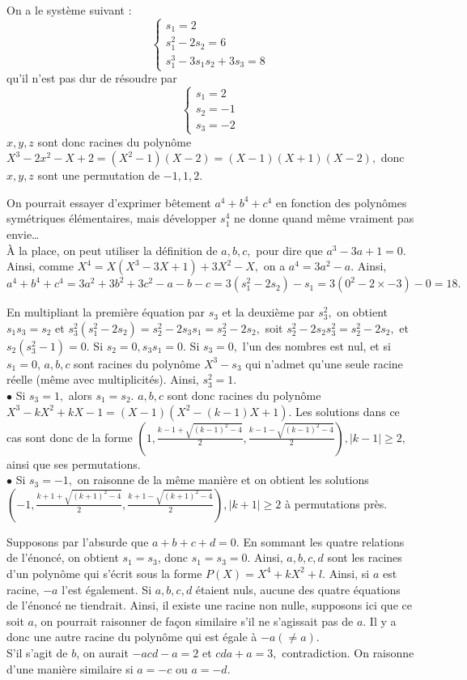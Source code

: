 \begin{sol}On a le système suivant :
\[\begin{cases}
s_1=2\\
s_1^2-2s_2=6\\
s_1^3-3s_1s_2+3s_3=8
\end{cases}\]qu'il n'est pas dur de résoudre par
$$\begin{cases}
s_1=2\\
s_2=-1\\
s_3=-2
\end{cases}$$
$x,y,z$ sont donc racines du polynôme $X^3-2x^2-X+2=(X^2-1)(X-2)=(X-1)(X+1)(X-2),$ donc $x,y,z$ sont une permutation de $-1,1,2$.
\end{sol}
\begin{sol}
On pourrait essayer d'exprimer bêtement $a^4+b^4+c^4$ en fonction des polynômes symétriques élémentaires, mais développer $s_1^4$ ne donne quand même vraiment pas envie…\\À la place, on peut utiliser la définition de $a,b,c,$ pour dire que $a^3-3a+1=0.$ Ainsi, comme $X^4=X(X^3-3X+1)+3X^2-X,$ on a $a^4=3a^2-a.$ Ainsi, $a^4+b^4+c^4=3a^2+3b^2+3c^2-a-b-c=3(s_1^2-2s_2)-s_1=3(0^2-2\times -3)-0=18.$
\end{sol}
\begin{sol}
En multipliant la première équation par $s_3$ et la deuxième par $s_3^2,$ on obtient $s_1s_3=s_2$ et $s_3^2(s_1^2-2s_2)=s_2^2-2s_3s_1=s_2^2-2s_2,$ soit $s_2^2-2s_2s_3^2=s_2^2-2s_2,$ et $s_2(s_3^2-1)=0.$ Si $s_2=0,s_3s_1=0.$ Si $s_3=0,$ l'un des nombres est nul, et si $s_1=0$, $a,b,c$ sont racines du polynôme $X^3-s_3$ qui n'admet qu'une seule racine réelle (même avec multiplicités). Ainsi, $s_3^2=1.$\\$\bullet$ Si $s_3=1,$ alors $s_1=s_2.$ $a,b,c$ sont donc racines du polynôme $X^3-kX^2+kX-1=(X-1)(X^2-(k-1)X+1).$ Les solutions dans ce cas sont donc de la forme $(1,\frac{k-1+\sqrt{(k-1)^2-4}}2,\frac{k-1-\sqrt{(k-1)^2-4}}2),|k-1|\geqslant 2,$ ainsi que ses permutations.\\
$\bullet$ Si $s_3=-1,$ on raisonne de la même manière et on obtient les solutions $(-1,\frac{k+1+\sqrt{(k+1)^2-4}}2,\frac{k+1-\sqrt{(k+1)^2-4}}2) ,|k+1|\geqslant 2$ à permutations près.
\end{sol}
\begin{sol}
Supposons par l'absurde que $a+b+c+d=0.$ En sommant les quatre relations de l'énoncé, on obtient $s_1=s_3$, donc $s_1=s_3=0.$ Ainsi, $a,b,c,d$ sont les racines d'un polynôme qui s'écrit sous la forme $P(X)=X^4+kX^2+l$. Ainsi, si $a$ est racine, $-a$ l'est également. Si $a,b,c,d$ étaient nuls, aucune des quatre équations de l'énoncé ne tiendrait. Ainsi, il existe une racine non nulle, supposons ici que ce soit $a$, on pourrait raisonner de façon similaire s'il ne s'agissait pas de $a$. Il y a donc une autre racine du polynôme qui est égale à $-a(\ne a)$.\\
S'il s'agit de $b$, on aurait $-acd-a=2$ et $cda+a=3,$ contradiction. On raisonne d'une manière similaire si $a=-c$ ou $a=-d.$
\end{sol}
